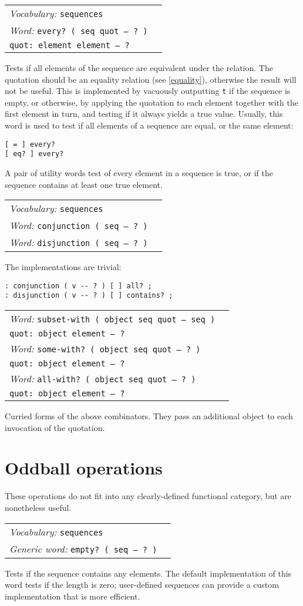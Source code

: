 \documentclass{book}
\newcommand{\vocabulary}[1]{\emph{Vocabulary:} \texttt{#1}&\\}
\newcommand{\ordinaryword}[2]{\index{\texttt{#1}}\emph{Word:} \texttt{#2}&\\}
\newcommand{\genericword}[2]{\index{\texttt{#1}}\emph{Generic word:} \texttt{#2}&\\}
\newcommand{\wordtable}[1]{


\begin{tabularx}{12cm}{lX}
\hline
#1
\hline
\end{tabularx}

}
\begin{document}
\wordtable{
\vocabulary{sequences}
\ordinaryword{every?}{every?~( seq quot -- ?~)}
\texttt{quot:~element element -- ?}\\
}
Tests if all elements of the sequence are equivalent under the relation. The quotation should be an equality relation (see \ref{equality}), otherwise the result will not be useful. This is implemented by vacuously outputting \verb|t| if the sequence is empty, or otherwise, by applying the quotation to each element together with the first element in turn, and testing if it always yields a true value. Usually, this word is used to test if all elements of a sequence are equal, or the same element:
\begin{verbatim}
[ = ] every?
[ eq? ] every?
\end{verbatim}

A pair of utility words test of every element in a sequence is true, or if the sequence contains at least one true element.
\wordtable{
\vocabulary{sequences}
\ordinaryword{conjunction}{conjunction~( seq -- ?~)}
\ordinaryword{disjunction}{disjunction~( seq -- ?~)}
}
The implementations are trivial:
\begin{verbatim}
: conjunction ( v -- ? ) [ ] all? ;
: disjunction ( v -- ? ) [ ] contains? ;
\end{verbatim}

\wordtable{
\ordinaryword{subset-with}{subset-with ( object seq quot -- seq )}
\texttt{quot:~object element -- ?}\\
\ordinaryword{some-with?}{some-with?~( object seq quot -- ?~)}
\texttt{quot:~object element -- ?}\\
\ordinaryword{all-with?}{all-with?~( object seq quot -- ?~)}
\texttt{quot:~object element -- ?}\\
}
Curried forms of the above combinators. They pass an additional object to each invocation of the quotation.

\section{Oddball operations}\label{oddball-seq}

These operations do not fit into any clearly-defined functional category, but are nonetheless useful.
\wordtable{
\vocabulary{sequences}
\genericword{empty?}{empty?~( seq -- ?~)}
}
Tests if the sequence contains any elements. The default implementation of this word tests if the length is zero; user-defined sequences can provide a custom implementation that is more efficient.
\end{document}
